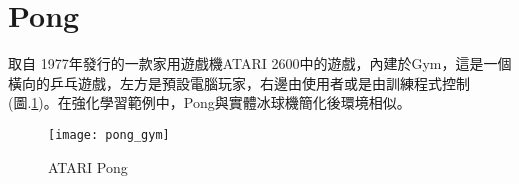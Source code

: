 \section{Pong}
 取自 1977年發行的一款家用遊戲機ATARI 2600中的遊戲，內建於Gym，這是一個橫向的乒乓遊戲，左方是預設電腦玩家，右邊由使用者或是由訓練程式控制(圖.\ref{fig.pong})。在強化學習範例中，Pong與實體冰球機簡化後環境相似。\\
\begin{figure}[hbt!]
\begin{center}
\texttt{[image: pong\_gym]}
\caption{\Large ATARI Pong}\label{fig.pong}
\end{center}
\end{figure} 

\newpage